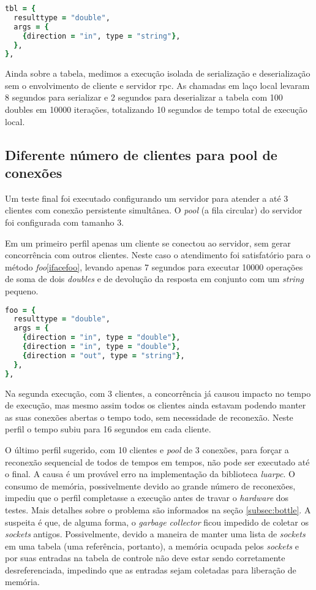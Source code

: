 \documentclass[11pt]{article}
\begin{document}
\begin{lstlisting}[label={ifacetbl},language=Ruby,caption=Interface tbl]
tbl = {
  resulttype = "double",
  args = {
    {direction = "in", type = "string"},
  },
},
\end{lstlisting}

Ainda sobre a tabela, medimos a execução isolada de serialização e
deserialização sem o envolvimento de cliente e servidor \gls{rpc}. As chamadas
em laço local levaram 8 segundos para serializar e 2 segundos para deserializar
a tabela com 100 doubles em 10000 iterações, totalizando 10 segundos de tempo
total de execução local.

\subsection{Diferente número de clientes para pool de conexões}\label{subsec:diffpool}

Um teste final foi executado configurando um servidor para atender a até 3
clientes com conexão persistente simultânea. O \textit{pool} (a fila circular)
do servidor foi configurada com tamanho 3.

Em um primeiro perfil apenas um cliente se conectou ao servidor, sem gerar
concorrência com outros clientes. Neste caso o atendimento foi satisfatório para
o método \textit{foo}\ref{ifacefoo}, levando apenas 7 segundos para executar
10000 operações de soma de dois \textit{doubles} e de devolução da resposta em
conjunto com um \textit{string} pequeno.

\begin{lstlisting}[label={ifacefoo},language=Ruby,caption=Interface foo]
foo = {
  resulttype = "double",
  args = {
    {direction = "in", type = "double"},
    {direction = "in", type = "double"},
    {direction = "out", type = "string"},
  },
},
\end{lstlisting}

Na segunda execução, com 3 clientes, a concorrência já causou impacto no tempo
de execução, mas mesmo assim todos os clientes ainda estavam podendo manter as
suas conexões abertas o tempo todo, sem necessidade de reconexão. Neste perfil o
tempo subiu para 16 segundos em cada cliente.

O último perfil sugerido, com 10 clientes e \textit{pool} de 3 conexões, para
forçar a reconexão sequencial de todos de tempos em tempos, não pode ser
executado até o final. A causa é um provável erro na implementação da biblioteca
\textit{luarpc}. O consumo de memória, possivelmente devido ao grande número de
reconexões, impediu que o perfil completasse a execução antes de travar o
\textit{hardware} dos testes. Mais detalhes sobre o problema são informados na
seção \ref{subsec:bottle}. A suspeita é que, de alguma forma, o \textit{garbage
collector} ficou impedido de coletar os \textit{sockets} antigos. Possivelmente,
devido a maneira de manter uma lista de \textit{sockets} em uma tabela (uma
referência, portanto), a memória ocupada pelos \textit{sockets} e por suas
entradas na tabela de controle não deve estar sendo corretamente
desreferenciada, impedindo que as entradas sejam coletadas para liberação de
memória.
\end{document}
